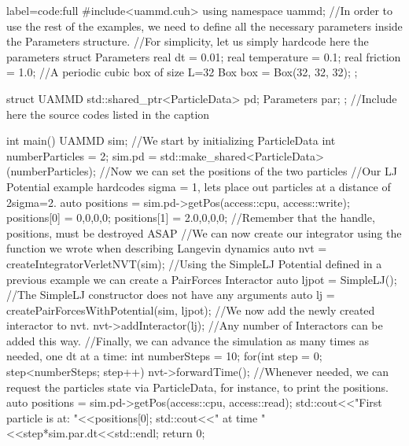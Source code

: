\documentclass[twoside,openright,titlepage,numbers=noenddot,%
headinclude,footinclude,cleardoublepage=empty,abstract=on,
BCOR=5mm,fontsize=11pt, dvipsnames, paper=b5
]{scrreprt}
\begin{document}
\begin{code2}{label=code:full}
  #include<uammd.cuh>
  using namespace uammd;
  //In order to use the rest of the examples, we need to define all the necessary parameters inside the Parameters structure.
  //For simplicity, let us simply hardcode here the parameters
  struct Parameters{
    real dt = 0.01;
    real temperature = 0.1;
    real friction = 1.0;
    //A periodic cubic box of size L=32
    Box box = Box({32, 32, 32});
  };
  
  struct UAMMD{
    std::shared_ptr<ParticleData> pd;
    Parameters par;
  };
  //Include here the source codes listed in the caption

  int main(){
    UAMMD sim;
    //We start by initializing ParticleData
    int numberParticles = 2;
    sim.pd = std::make_shared<ParticleData>(numberParticles);
    //Now we can set the positions of the two particles
    {//Our LJ Potential example hardcodes sigma = 1, lets place out particles at a distance of 2sigma=2.
      auto positions = sim.pd->getPos(access::cpu, access::write);
      positions[0] = {0,0,0,0};
      positions[1] = {2.0,0,0,0};
    }//Remember that the handle, positions, must be destroyed ASAP
    //We can now create our integrator using the function we wrote when describing Langevin dynamics
    auto nvt = createIntegratorVerletNVT(sim);
    //Using the SimpleLJ Potential defined in a previous example we can create a PairForces Interactor
    auto ljpot = SimpleLJ(); //The SimpleLJ constructor does not have any arguments
    auto lj = createPairForcesWithPotential(sim, ljpot);
    //We now add the newly created interactor to nvt.
    nvt->addInteractor(lj);
    //Any number of Interactors can be added this way.
    //Finally, we can advance the simulation as many times as needed, one dt at a time:
    int numberSteps = 10;
    for(int step = 0; step<numberSteps; step++){
      nvt->forwardTime();
      //Whenever needed, we can request the particles state via ParticleData, for instance, to print the positions.
      {
        auto positions = sim.pd->getPos(access::cpu, access::read);
        std::cout<<"First particle is at: "<<positions[0];
        std::cout<<" at time "<<step*sim.par.dt<<std::endl;
      }
    }
    return 0;
  }
\end{code2}
\end{document}
